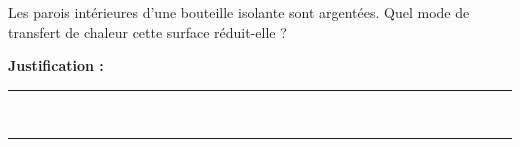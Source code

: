 Les parois intérieures d'une bouteille isolante sont argentées. Quel mode de transfert de chaleur cette surface réduit-elle ?

\choices

\noindent\textbf{Justification :} \hrulefill \\[2.5ex]
\rule{\linewidth}{0.4pt} \\[2.5ex]
\rule{\linewidth}{0.4pt}
\vfill

